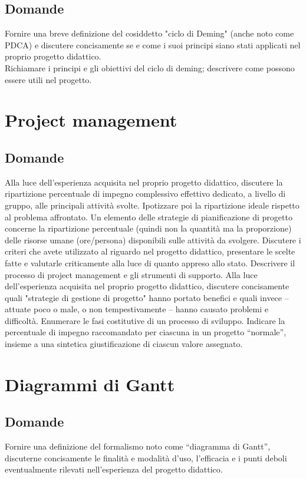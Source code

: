 \subsection*{Domande}
Fornire una breve definizione del cosiddetto "ciclo di Deming" (anche noto come PDCA) e discutere concisamente se e come i suoi principi siano stati applicati nel proprio progetto didattico.\\

Richiamare i principi e gli obiettivi del ciclo di deming; descrivere come possono essere utili nel progetto.

\section{Project management}

\subsection*{Domande}
Alla luce dell'esperienza acquisita nel proprio progetto didattico, discutere la ripartizione percentuale di impegno complessivo effettivo dedicato, a livello di gruppo, alle principali attività svolte. Ipotizzare poi la ripartizione ideale rispetto al problema affrontato.
Un elemento delle strategie di pianificazione di progetto concerne la ripartizione percentuale (quindi non la quantità ma la proporzione) delle risorse umane (ore/persona) disponibili sulle attività da svolgere. Discutere i criteri che avete utilizzato al riguardo nel progetto didattico, presentare le scelte fatte e valutarle criticamente alla luce di quanto appreso allo stato.
Descrivere il processo di project management e gli strumenti di supporto.
Alla luce dell'esperienza acquisita nel proprio progetto didattico, discutere concisamente quali "strategie di gestione di progetto" hanno portato benefici e quali invece – attuate poco o male, o non tempestivamente – hanno causato problemi e difficoltà.
Enumerare le fasi costitutive di un processo di sviluppo. Indicare la percentuale di impegno raccomandato per ciascuna in un progetto “normale”, insieme a una sintetica giustificazione di ciascun valore assegnato.

\section{Diagrammi di Gantt}

\subsection*{Domande}
Fornire una definizione del formalismo noto come “diagramma di Gantt”, discuterne concisamente le finalità e modalità d'uso, l'efficacia e i punti deboli eventualmente rilevati nell'esperienza del progetto didattico.\\

